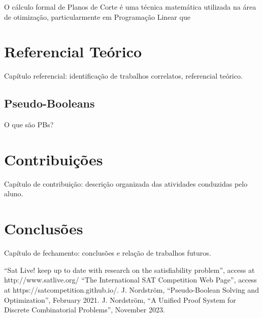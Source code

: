 \documentclass[conference]{IEEEtran}
\begin{document}


O cálculo formal de Planos de Corte é uma técnica matemática utilizada na área de otimização,
particularmente em Programação Linear que

\section{Referencial Teórico}
Capítulo referencial: identificação de trabalhos correlatos, referencial teórico.

\subsection{Pseudo-Booleans}
O que são PBs?

\section{Contribuições}
Capítulo de contribuição: descrição organizada das atividades conduzidas pelo
aluno.

\section*{Conclusões}
Capítulo de fechamento: conclusões e relação de trabalhos futuros.

\begin{thebibliography}{00}
       ``Sat Live! keep up to date with research on the satisfiability problem'', access at http://www.satlive.org/
       ``The International SAT Competition Web Page'', access at https://satcompetition.github.io/.
       J. Nordström, ``Pseudo-Boolean Solving and Optimization'', February 2021.
      J. Nordström, ``A Unified Proof System for Discrete Combinatorial Problems'', November 2023.

\end{thebibliography}
\vspace{12pt}
\end{document}

